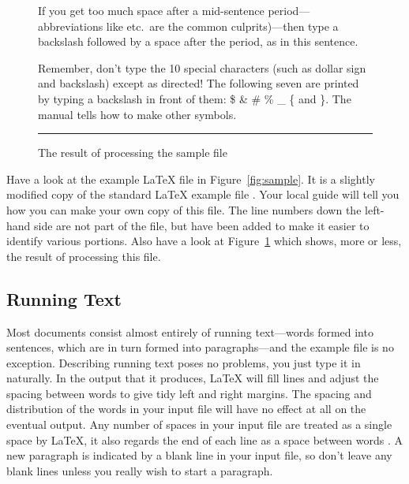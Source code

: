 \begin{figure}
If you get too much space after a mid-sentence period---abbreviations
like etc.\ are the common culprits)---then type a backslash followed by
a space after the period, as in this sentence.

Remember, don't type the 10 special characters (such as dollar sign and
backslash) except as directed!  The following seven are printed by
typing a backslash in front of them:  \$  \&  \#  \%  \_  \{  and  \}.
The manual tells how to make other symbols.

% 

\noindent\rule{\textwidth}{0.8pt}

\setcounter{section}{\value{savesection}}
\setcounter{subsection}{\value{savesubsection}}

\caption{The result of processing the sample file}\label{fig:result}

\end{figure} %

Have a look at the example \LaTeX{} file in Figure~\ref{fig:sample}.  It
is a slightly modified copy of the standard \LaTeX{} example file
.  Your local guide will tell you how you can make
your own copy of this file.  The line numbers down the left-hand side
are not part of the file, but have been added to make it easier to
identify various portions. Also have a look at Figure~\ref{fig:result} which
shows, more or less, the result of processing this file.

\subsection{Running Text}

Most documents consist almost entirely of running text---words formed
into sentences, which are in turn formed into paragraphs---and the example file
is no exception. Describing running text poses no problems, you just type
it in naturally. In the output that it produces, \LaTeX{} will fill
lines and adjust the
spacing between words to give tidy left and right margins.
The spacing and distribution of the words in your input
file will have no effect at all on the eventual output.
Any number of spaces in your input file
are treated as a single space by \LaTeX{}, it also regards the
end of each line as a space between words .
A new paragraph is
indicated by a blank line in your input file, so don't leave
any blank lines unless you really wish to start a paragraph.

